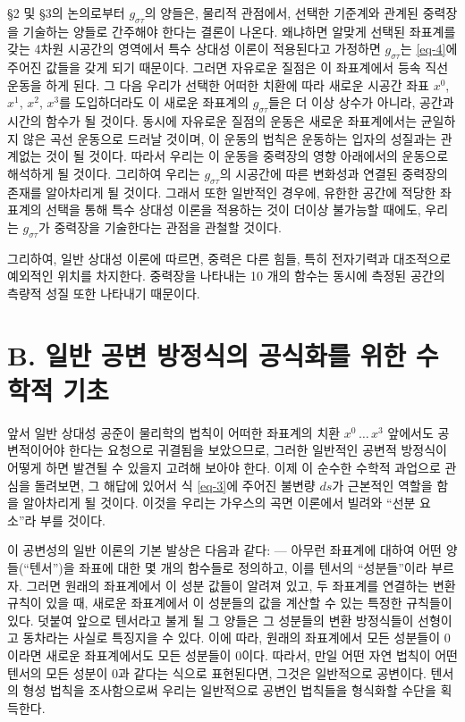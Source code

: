 \documentclass[b5paper]{article}
\begin{document}
\S 2 및 \S 3의 논의로부터 $g_{\sigma\tau}$의 양들은, 물리적 관점에서, 선택한 기준계와 관계된 중력장을 기술하는 양들로 간주해야 한다는 결론이 나온다. 왜냐하면 알맞게 선택된 좌표계를 갖는 4차원 시공간의 영역에서 특수 상대성 이론이 적용된다고 가정하면 $g_{\sigma\tau}$는 \eqref{eq-4}에 주어진 값들을 갖게 되기 때문이다. 그러면 자유로운 질점은 이 좌표계에서 등속 직선 운동을 하게 된다. 그 다음 우리가 선택한 어떠한 치환에 따라 새로운 시공간 좌표 $x^0$, $x^1$, $x^2$, $x^3$를 도입하더라도 이 새로운 좌표계의 $g_{\sigma\tau}$들은 더 이상 상수가 아니라, 공간과 시간의 함수가 될 것이다. 동시에 자유로운 질점의 운동은 새로운 좌표계에서는 균일하지 않은 곡선 운동으로 드러날 것이며, 이 운동의 법칙은 운동하는 입자의 성질과는 관계없는 것이 될 것이다. 따라서 우리는 이 운동을 중력장의 영향 아래에서의 운동으로 해석하게 될 것이다. 그리하여 우리는 $g_{\sigma\tau}$의 시공간에 따른 변화성과 연결된 중력장의 존재를 알아차리게 될 것이다. 그래서 또한 일반적인 경우에, 유한한 공간에 적당한 좌표계의 선택을 통해 특수 상대성 이론을 적용하는 것이 더이상 불가능할 때에도, 우리는 $g_{\sigma\tau}$가 중력장을 기술한다는 관점을 관철할 것이다.

그리하여, 일반 상대성 이론에 따르면, 중력은 다른 힘들, 특히 전자기력과 대조적으로 예외적인 위치를 차지한다. 중력장을 나타내는 10 개의 함수는 동시에 측정된 공간의 측량적 성질 또한 나타내기 때문이다.

\section*{B. 일반 공변 방정식의 공식화를 위한 수학적 기초}

앞서 일반 상대성 공준이 물리학의 법칙이 어떠한 좌표계의 치환 $x^0\,\dots\,x^3$ 앞에서도 공변적이어야 한다는 요청으로 귀결됨을 보았으므로, 그러한 일반적인 공변적 방정식이 어떻게 하면 발견될 수 있을지 고려해 보아야 한다. 
이제 이 순수한 수학적 과업으로 관심을 돌려보면, 그 해답에 있어서 식 \eqref{eq-3}에 주어진 불변량 $ds$가 근본적인 역할을 함을 알아차리게 될 것이다. 이것을 우리는 가우스의 곡면 이론에서 빌려와 ``선분 요소''라 부를 것이다.

이 공변성의 일반 이론의 기본 발상은 다음과 같다: --- 아무런 좌표계에 대하여 어떤 양들(``텐서'')을 좌표에 대한 몇 개의 함수들로 정의하고, 이를 텐서의 ``성분들''이라 부르자. 그러면 원래의 좌표계에서 이 성분 값들이 알려져 있고, 두 좌표계를 연결하는 변환 규칙이 있을 때, 새로운 좌표계에서 이 성분들의 값을 계산할 수 있는 특정한 규칙들이 있다. 덧붙여 앞으로 텐서라고 불게 될 그 양들은 그 성분들의 변환 방정식들이 선형이고 동차라는 사실로 특징지을 수 있다. 이에 따라, 원래의 좌표계에서 모든 성분들이 0이라면 새로운 좌표계에서도 모든 성분들이 0이다. 따라서, 만일 어떤 자연 법칙이 어떤 텐서의 모든 성분이 0과 같다는 식으로 표현된다면, 그것은 일반적으로 공변이다. 텐서의 형성 법칙을 조사함으로써 우리는 일반적으로 공변인 법칙들을 형식화할 수단을 획득한다.
\end{document}
